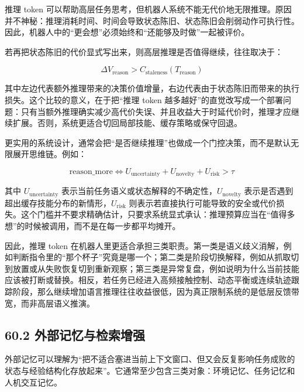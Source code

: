 推理 token 可以帮助高层任务思考，但机器人系统不能无代价地无限推理。原因并不神秘：推理消耗时间、时间会导致状态陈旧、状态陈旧会削弱动作可执行性。因此，机器人中的“更会想”必须始终和“还能够及时做”一起被评价。

若再把状态陈旧的代价显式写出来，则高层推理是否值得继续，往往取决于：

\begingroup
\footnotesize
\begin{equation*}
\Delta V_{\text{reason}} > C_{\text{staleness}}(T_{\text{reason}})
\end{equation*}
\endgroup

其中左边代表额外推理带来的决策价值增量，右边代表由于状态陈旧而带来的执行损失。这个比较的意义，在于把“推理 token 越多越好”的直觉改写成一个部署问题：只有当额外推理确实减少高代价失误、并且收益大于时延代价时，推理才应继续扩展。否则，系统更适合切回局部技能、缓存策略或保守回退。

更实用的系统设计，通常会把“是否继续推理”也做成一个门控决策，而不是默认无限展开思维链。例如：

\begingroup
\scriptsize
\begin{equation*}
\text{reason\_more}
\Longleftrightarrow
U_{\text{uncertainty}} + U_{\text{novelty}} + U_{\text{risk}} > \tau
\end{equation*}
\endgroup

其中 \(U_{\text{uncertainty}}\) 表示当前任务语义或状态解释的不确定性，\(U_{\text{novelty}}\) 表示是否遇到超出缓存技能分布的新情形，\(U_{\text{risk}}\) 则表示若直接执行可能导致的安全或代价损失。这个门槛并不要求精确估计，只要求系统显式承认：推理预算应当在“值得多想”的时候被调用，而不是在每一步都平均摊开。

因此，推理 token 在机器人里更适合承担三类职责。第一类是语义歧义消解，例如判断指令里的“那个杯子”究竟是哪一个；第二类是阶段切换解释，例如从抓取切到放置或从失败恢复切到重新观察；第三类是异常复盘，例如说明为什么当前技能应该被打断或替换。相反，若任务已经进入高频接触控制、动态平衡或连续轨迹跟踪阶段，那么继续增加语言推理往往收益很低，因为真正限制系统的是低层反馈带宽，而非高层语义推演。

\subsection*{60.2 外部记忆与检索增强}


外部记忆可以理解为“把不适合塞进当前上下文窗口、但又会反复影响任务成败的状态与经验结构化存放起来”。它通常至少包含三类对象：环境记忆、任务记忆和人机交互记忆。

